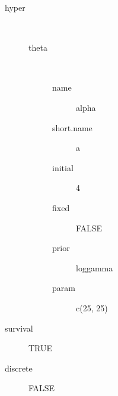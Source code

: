 \begin{description}
	\item[hyper]\ 
	 \begin{description}
	 	\item[theta]\ 
	 	 \begin{description}
	 	 	 \item[ name ] alpha 
	 	 	 \item[ short.name ] a 
	 	 	 \item[ initial ] 4 
	 	 	 \item[ fixed ] FALSE 
	 	 	 \item[ prior ] loggamma 
	 	 	 \item[ param ] c(25, 25) 
	 	 \end{description}
	 \end{description}
	 \item[ survival ] TRUE 
	 \item[ discrete ] FALSE 
\end{description}
